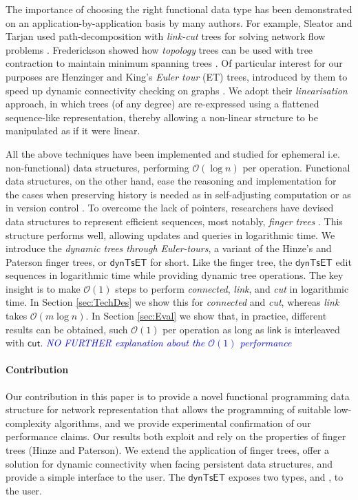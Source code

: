 \documentclass{elsarticle}
\newcommand{\code}[1]{\haskell{#1}}
\newcommand{\tcb} [1]{\emph{\textcolor{blue}{#1}}}
\newcommand{\MATHSF}[1]{\ensuremath{\mathsf{#1}}\xspace}
\newcommand{\link}{\MATHSF{link}}
\newcommand{\cut}{\MATHSF{cut}}
\newcommand{\dyntset}{\MATHSF{dynTsET}}
\renewcommand{\O}{\ensuremath{\mathcal{O}}}
\begin{document}
The importance of choosing the right functional data type has been demonstrated on an application-by-application basis by many authors. For example, Sleator and Tarjan used path-decomposition with \textit{link-cut} trees for solving network flow problems \cite{DS-DynTs}. Frederickson showed how \textit{topology} trees can be used with tree contraction to maintain minimum spanning trees \cite{DSs-Online-Upd-MSTs}. Of particular interest for our purposes are Henzinger and King's \textit{Euler tour} (ET) trees, introduced by them to speed up dynamic connectivity checking on graphs \cite{Rand-DynGs-Algos}. We adopt their \textit{linearisation} approach, in which trees (of any degree) are re-expressed using a flattened sequence-like representation, thereby allowing a non-linear structure to be manipulated as if it were linear.

All the above techniques have been implemented and studied for ephemeral i.e. non-functional) data structures, performing $\O(\log n)$ per operation. Functional data structures, on the other hand, ease the reasoning and implementation for the cases when preserving history is needed as in self-adjusting computation \cite{DynamizingAlgos} or as in version control \cite{CVS-Demaine}. To overcome the lack of pointers, researchers have devised data structures to represent efficient sequences, most notably, \textit{finger trees} \cite{FTs}. This structure performs well, allowing updates and queries in logarithmic time. We introduce the \emph{dynamic trees through Euler-tours}, a variant of the Hinze's and Paterson finger trees, or \dyntset for short. Like the finger tree, the \dyntset edit sequences in logarithmic time while providing dynamic tree operations. The key insight is to make $\O(1)$ steps to perform \textit{connected}, \textit{link}, and \textit{cut} in logarithmic time. In Section \ref{sec:TechDes} we show this for \textit{connected} and \textit{cut}, whereas \textit{link} takes $\O(m \log n)$. In Section \ref{sec:Eval} we show that, in practice, different results can be obtained, such $\O(1)$ per operation as long as \link is interleaved with \cut.
 \tcb{NO FURTHER explanation about the $\O(1)$ performance}


\paragraph{Contribution}
Our contribution in this paper is to provide a novel functional programming data structure for network representation that allows the programming of suitable low-complexity algorithms, and we provide experimental confirmation of our performance claims. Our results both exploit and rely on the properties of finger trees (Hinze and Paterson). We extend the application of finger trees, offer a solution for dynamic connectivity when facing persistent data structures, and provide a simple interface to the user. The \dyntset exposes two types, \code{Tree} and \code{Forest}, to the user. 
\end{document}
